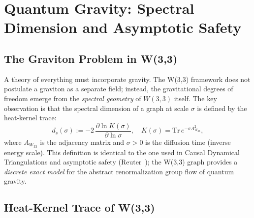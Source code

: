 %
%

\section{Quantum Gravity: Spectral Dimension and Asymptotic Safety}
\label{sec:gravity}

\subsection{The Graviton Problem in W(3,3)}

A theory of everything must incorporate gravity. The W(3,3) framework does
not postulate a graviton as a separate field; instead, the gravitational
degrees of freedom emerge from the \emph{spectral geometry} of $W(3,3)$
itself. The key observation is that the spectral dimension of a graph at
scale $\sigma$ is defined by the heat-kernel trace:
\begin{equation}
  d_s(\sigma) := -2\,\frac{\partial\ln K(\sigma)}{\partial\ln\sigma},
  \quad K(\sigma) = \mathrm{Tr}\,e^{-\sigma A_{W_{33}}^2},
\label{eq:ds_def}
\end{equation}
where $A_{W_{33}}$ is the adjacency matrix and $\sigma > 0$ is the
diffusion time (inverse energy scale). This definition is identical to the
one used in Causal Dynamical Triangulations and asymptotic safety
(Reuter~\cite{Reuter2012}); the W(3,3) graph provides a \emph{discrete
exact model} for the abstract renormalization group flow of quantum gravity.

\subsection{Heat-Kernel Trace of W(3,3)}

